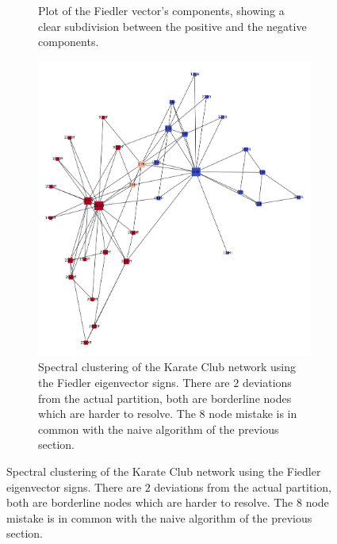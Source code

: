 \documentclass[a4paper,10pt]{article}
\theoremstyle{definition}
\theoremstyle{remark}
\theoremstyle{plain}
\begin{document}
\begin{figure}
\begin{framed}
\begin{subfigure}[b]{0.5\textwidth}
\caption{Plot of the Fiedler vector's components, showing a clear subdivision
between the positive and the negative components.}
\label{fig:toygraphfiedlerplot}
\end{subfigure}
\caption{}
\end{framed}
\end{figure}

\begin{figure}
\begin{framed}
\centering
\begin{subfigure}[b]{0.5\textwidth}
\includegraphics[width=\textwidth]{Karate_spectralT2clustering.png}
\caption{Spectral clustering of the Karate Club network using the Fiedler
eigenvector signs. There are $2$ deviations from the actual partition, both are
borderline nodes which are harder to resolve. The $8$ node mistake is in common
with the naive algorithm of the previous section.}
\label{fig:karatespectral}
\end{subfigure}

\end{framed}
\end{figure}
\end{document}
